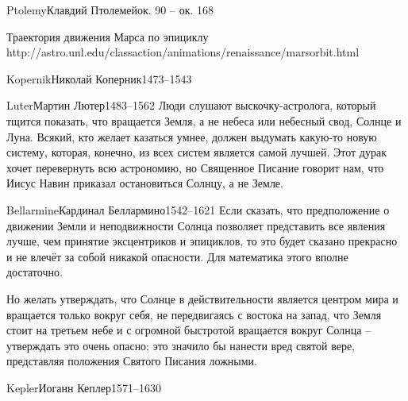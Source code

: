 \documentclass[aspectratio=169]{beamer}
\begin{document}
\begin{Person}{Ptolemy}{Клавдий Птолемей}{ок. 90 -- ок. 168}
\end{Person}

{Траектория движения Марса по эпициклу\\http://astro.unl.edu/classaction/animations/renaissance/marsorbit.html}

\begin{Person}{Kopernik}{Николай Коперник}{1473--1543}
\end{Person}

\begin{Person}{Luter}{Мартин Лютер}{1483--1562}
Люди слушают выскочку-астролога, который тщится показать, что вращается Земля, а не небеса
или небесный свод, Солнце и Луна. Всякий, кто желает казаться умнее, должен выдумать
какую-то новую систему, которая, конечно, из всех систем является самой лучшей. Этот
дурак хочет перевернуть всю астрономию, но Священное Писание говорит нам, что Иисус
Навин приказал остановиться Солнцу, а не Земле.
\end{Person}


\begin{Person}{Bellarmine}{Кардинал Беллармино}{1542--1621}
Если сказать, что предположение о движении Земли и неподвижности Солнца позволяет 
представить все явления лучше, чем принятие эксцентриков и эпициклов, 
то это будет сказано прекрасно и не влечёт за собой никакой опасности. Для математика 
этого вполне достаточно. 

Но желать утверждать, что Солнце в действительности является центром мира и
 вращается только вокруг себя, не передвигаясь с востока на запад, 
что Земля стоит на третьем небе и с огромной быстротой вращается вокруг Солнца --
 утверждать это очень опасно; это значило бы нанести вред святой вере,
 представляя положения Святого Писания ложными.
\end{Person}

\begin{Person}{Kepler}{Иоганн Кеплер}{1571--1630}
\end{Person}
\end{document}
